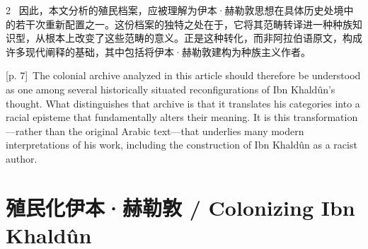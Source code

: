 \documentclass[10pt,a4paper]{article}
\begin{document}
\begin{paracol}{2}
\switchcolumn*
{\scriptsize\color{gray} [p. 7]}\ 因此，本文分析的殖民档案，应被理解为伊本·赫勒敦思想在具体历史处境中的若干次重新配置之一。这份档案的独特之处在于，它将其范畴转译进一种种族知识型，从根本上改变了这些范畴的意义。正是这种转化，而非阿拉伯语原文，构成许多现代阐释的基础，其中包括将伊本·赫勒敦建构为种族主义作者。\par
\switchcolumn
{\scriptsize\color{gray} [p. 7]}\ The colonial archive analyzed in this article should therefore be understood as one among several historically situated reconfigurations of Ibn Khaldûn’s thought. What distinguishes that archive is that it translates his categories into a racial episteme that fundamentally alters their meaning. It is this transformation—rather than the original Arabic text—that underlies many modern interpretations of his work, including the construction of Ibn Khaldûn as a racist author.\par
\switchcolumn*
\end{paracol}
\section*{殖民化伊本·赫勒敦 / Colonizing Ibn Khaldûn}
\end{document}
